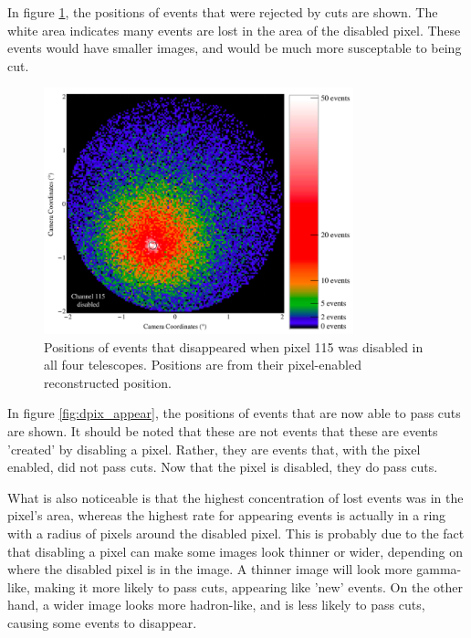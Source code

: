     In figure \ref{fig:dpix_disappear}, the positions of events that were rejected by cuts are shown.
    The white area indicates many events are lost in the area of the disabled pixel.
    These events would have smaller images, and would be much more susceptable to being cut.

    \begin{figure}[ht]
      \begin{center}
        \includegraphics[width=0.8\textwidth]{images/disabled_pixel/disappearing_events}
        \caption[Disappering Events]{Positions of events that disappeared when pixel 115 was disabled in all four telescopes.  Positions are from their pixel-enabled reconstructed position.}\label{fig:dpix_disappear}
      \end{center}
    \end{figure}

    In figure \ref{fig:dpix_appear}, the positions of events that are now able to pass cuts are shown.
    It should be noted that these are not events that these are events 'created' by disabling a pixel.
    Rather, they are events that, with the pixel enabled, did not pass cuts.
    Now that the pixel is disabled, they do pass cuts.

    What is also noticeable is that the highest concentration of lost events was in the pixel's area, whereas the highest rate for appearing events is actually in a ring with a radius of  pixels around the disabled pixel.
    This is probably due to the fact that disabling a pixel can make some images look thinner or wider, depending on where the disabled pixel is in the image.
    A thinner image will look more gamma-like, making it more likely to pass cuts, appearing like 'new' events.
    On the other hand, a wider image looks more hadron-like, and is less likely to pass cuts, causing some events to disappear.

